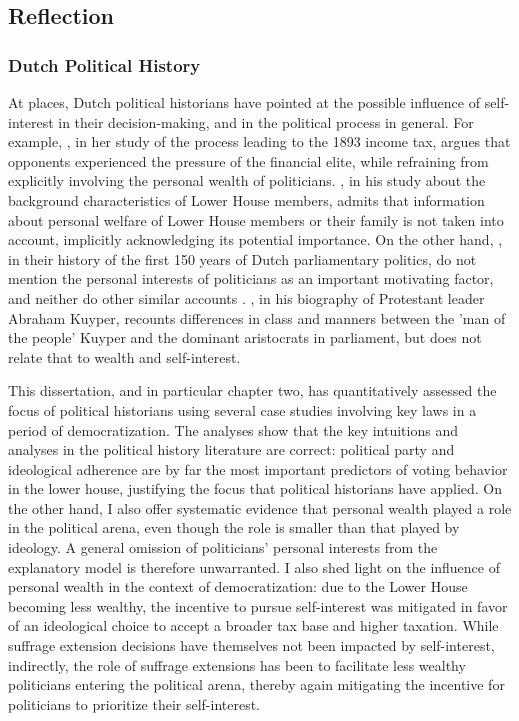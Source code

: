 \subsection{Reflection}\label{sec:reflection}

\subsubsection{Dutch Political History}

At places, Dutch political historians have pointed at the possible influence of self-interest in their decision-making, and in the political process in general. For example, \cite{smit2002omwille}, in her study of the process leading to the 1893 income tax, argues that opponents experienced the pressure of the financial elite, while refraining from explicitly involving the personal wealth of politicians. \cite{van1983toegang}, in his study about the background characteristics of Lower House members, admits that information about personal welfare of Lower House members or their family is not taken into account, implicitly acknowledging its potential importance. On the other hand, \cite{van2013eerste}, in their history of the first 150 years of Dutch parliamentary politics, do not mention the personal interests of politicians as an important motivating factor, and neither do other similar accounts \cite{de2003het, de2014ons}. \cite{koch2020abraham}, in his biography of Protestant leader Abraham Kuyper, recounts differences in class and manners between the 'man of the people' Kuyper and the dominant aristocrats in parliament, but does not relate that to wealth and self-interest. 

This dissertation, and in particular chapter two, has quantitatively assessed the focus of political historians using several case studies involving key laws in a period of democratization. The analyses show that the key intuitions and analyses in the political history literature are correct: political party and ideological adherence are by far the most important predictors of voting behavior in the lower house, justifying the focus that political historians have applied. On the other hand, I also offer systematic evidence that personal wealth played a role in the political arena, even though the role is smaller than that played by ideology. A general omission of politicians' personal interests from the explanatory model is therefore unwarranted. I also shed light on the influence of personal wealth in the context of democratization: due to the Lower House becoming less wealthy, the incentive to pursue self-interest was mitigated in favor of an ideological choice to accept a broader tax base and higher taxation. While suffrage extension decisions have themselves not been impacted by self-interest, indirectly, the role of suffrage extensions has been to facilitate less wealthy politicians entering the political arena, thereby again mitigating the incentive for politicians to prioritize their self-interest. 

